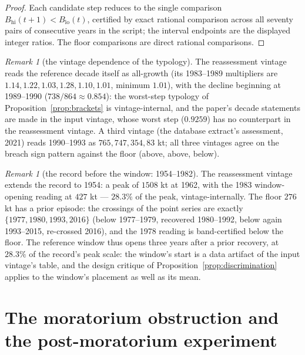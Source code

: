 \documentclass[10pt,twocolumn]{article}
\theoremstyle{plain}
\theoremstyle{remark}
\newtheorem{remark}[theorem]{Remark}
\begin{document}
\begin{proof}
Each candidate step reduces to the single comparison
\(B_{\mathrm{hi}}(t+1) < B_{\mathrm{lo}}(t)\), certified by exact
rational comparison across all seventy pairs of consecutive years in
the script; the interval endpoints are the displayed integer ratios.
The floor comparisons are direct rational comparisons.
\end{proof}

\begin{remark}[the vintage dependence of the typology]
\label{rem:vintagetypology}
The reassessment vintage reads the reference decade itself as
all-growth (its 1983--1989 multipliers are \(1.14, 1.22, 1.03, 1.28,
1.10, 1.01\), minimum \(1.01\)), with the decline beginning at
1989--1990 (\(738/864 \approx 0.854\)): the worst-step typology of
Proposition~\ref{prop:brackets} is vintage-internal, and the
paper's decade statements are made in the input vintage, whose
worst step (\(0.9259\)) has no counterpart in the reassessment
vintage. A third vintage (the database extract's assessment, 2021)
reads 1990--1993 as \(765, 747, 354, 83\) kt; all three vintages
agree on the breach sign pattern against the floor (above, above,
below).
\end{remark}

\begin{remark}[the record before the window: 1954--1982]
\label{rem:backward}
The reassessment vintage extends the record to 1954: a peak of
\(1508\) kt at 1962, with the 1983 window-opening reading at
\(427\) kt --- \(28.3\%\) of the peak, vintage-internally. The floor
\(276\) kt has a prior episode: the crossings of the point series are
exactly \(\{1977, 1980, 1993, 2016\}\) (below 1977--1979, recovered
1980--1992, below again 1993--2015, re-crossed 2016), and the 1978
reading is band-certified below the floor. The reference window thus
opens three years after a prior recovery, at \(28.3\%\) of the
record's peak scale: the window's start is a data artifact of the
input vintage's table, and the design critique of
Proposition~\ref{prop:discrimination} applies to the window's
placement as well as its mean.
\end{remark}

\section{The moratorium obstruction and the post-moratorium
experiment}\label{moratorium}
\end{document}
